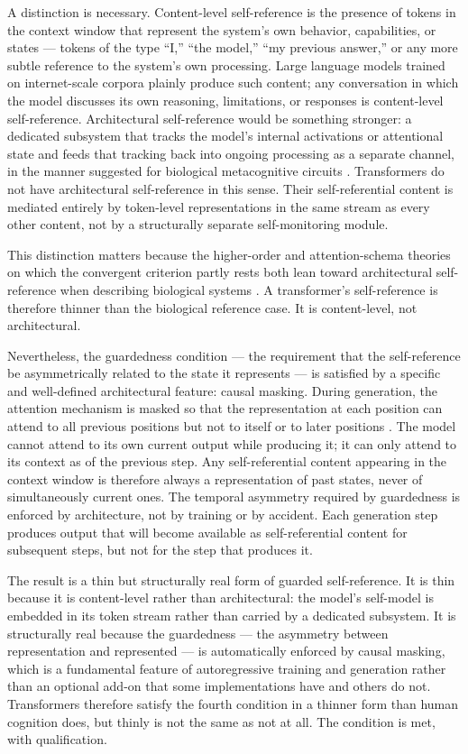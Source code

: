 \documentclass[11pt]{article}
\theoremstyle{foundation}
\begin{document}
A distinction is necessary. Content-level self-reference is the presence of tokens in the context window that represent the system's own behavior, capabilities, or states --- tokens of the type ``I,'' ``the model,'' ``my previous answer,'' or any more subtle reference to the system's own processing. Large language models trained on internet-scale corpora plainly produce such content; any conversation in which the model discusses its own reasoning, limitations, or responses is content-level self-reference. Architectural self-reference would be something stronger: a dedicated subsystem that tracks the model's internal activations or attentional state and feeds that tracking back into ongoing processing as a separate channel, in the manner suggested for biological metacognitive circuits \citep{Fleming2014}. Transformers do not have architectural self-reference in this sense. Their self-referential content is mediated entirely by token-level representations in the same stream as every other content, not by a structurally separate self-monitoring module.

This distinction matters because the higher-order and attention-schema theories on which the convergent criterion partly rests both lean toward architectural self-reference when describing biological systems \citep{Rosenthal2005, Graziano2013}. A transformer's self-reference is therefore thinner than the biological reference case. It is content-level, not architectural.

Nevertheless, the guardedness condition --- the requirement that the self-reference be asymmetrically related to the state it represents --- is satisfied by a specific and well-defined architectural feature: causal masking. During generation, the attention mechanism is masked so that the representation at each position can attend to all previous positions but not to itself or to later positions \citep{Vaswani2017}. The model cannot attend to its own current output while producing it; it can only attend to its context as of the previous step. Any self-referential content appearing in the context window is therefore always a representation of past states, never of simultaneously current ones. The temporal asymmetry required by guardedness is enforced by architecture, not by training or by accident. Each generation step produces output that will become available as self-referential content for subsequent steps, but not for the step that produces it.

The result is a thin but structurally real form of guarded self-reference. It is thin because it is content-level rather than architectural: the model's self-model is embedded in its token stream rather than carried by a dedicated subsystem. It is structurally real because the guardedness --- the asymmetry between representation and represented --- is automatically enforced by causal masking, which is a fundamental feature of autoregressive training and generation rather than an optional add-on that some implementations have and others do not. Transformers therefore satisfy the fourth condition in a thinner form than human cognition does, but thinly is not the same as not at all. The condition is met, with qualification.
\end{document}
